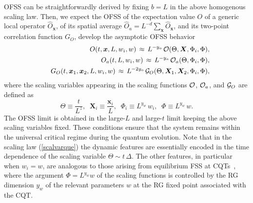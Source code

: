  
OFSS can be straightforwardly derived by fixing $b=L$ in the above
homogenous scaling law. Then, we expect the OFSS of the expectation
value $O$ of a generic local operator $\hat{O}_{\bm x}$, of its
spatial average $\hat{O}_a =L^{-d}\sum_{\bm x}\hat{O}_{\bm x}$, and
its two-point correlation function $G_O$, develop the asymptotic OFSS
behavior~\cite{PRV-18,RV-21}
\begin{eqnarray}
  && O(t, {\bm x}, L, w_i, w) \, \approx \, L^{-y_o} \,
  {\cal O}(\Theta, {\bm X}, \Phi_i, \Phi),
\nonumber\\
  && O_a(t, L, w_i, w) \, \approx \, L^{-y_o} \, {\cal O}_a(\Theta,
\Phi_i, \Phi),   \label{Oscaquefss}\\
  && G_{O}(t, {\bm x}_1, {\bm x}_2, L,
  w_i, w) \, \approx \, L^{-2y_o} \, {\cal G}_{O}(\Theta, {\bm X}_1,
  {\bm X}_2, \Phi_i, \Phi), \nonumber
\end{eqnarray}
where the scaling variables appearing in the scaling functions ${\cal
  O}$, ${\cal O}_a$, and ${\cal G}_O$ are defined as
\begin{equation}
  \Theta\equiv\frac{t}{L^z},\;\; {\bm X}_i \equiv \frac{{\bm x}_i}{L},\;\;
  \Phi_{i} \equiv
L^{y_w} \, w_i , \;\; \Phi \equiv L^{y_w} \,w.
  \label{scalvarque}
\end{equation}
The OFSS limit is obtained in the large-$L$ and large-$t$ limit
keeping the above scaling variables fixed. These conditions ensure
that the system remains within the universal critical regime during
the quantum evolution.  Note that in the scaling law
(\ref{scalvarque}) the dynamic features are essentially encoded in the
time dependence of the scaling variable $\Theta\sim t\,\Delta$.  The
other features, in particular when $w_i=w$, are analogous to those
arising from equilibrium FSS at CQTs~\cite{CPV-14,RV-21}, where the
argument $\Phi=L^{y_w} w$ of the scaling functions is controlled by
the RG dimension $y_w$ of the relevant parameters $w$ at the RG fixed
point associated with the CQT.


